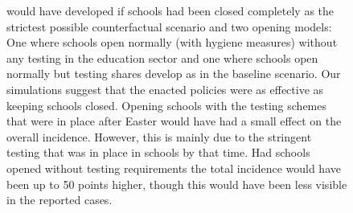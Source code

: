 \begin{figure}[ht]
{   would have developed if schools had been closed completely as the strictest possible
   counterfactual scenario and two opening models: One where schools open normally (with
   hygiene measures) without any testing in the education sector and one where schools
   open normally but testing shares develop as in the baseline scenario. Our simulations
   suggest that the enacted policies were as effective as keeping schools closed. Opening
   schools with the testing schemes that were in place after Easter would have had a
   small effect on the overall incidence. However, this is mainly due to the stringent
   testing that was in place in schools by that time. Had schools opened without testing
   requirements the total incidence would have been up to 50 points higher, though this
   would have been less visible in the reported cases.}
\end{figure}


